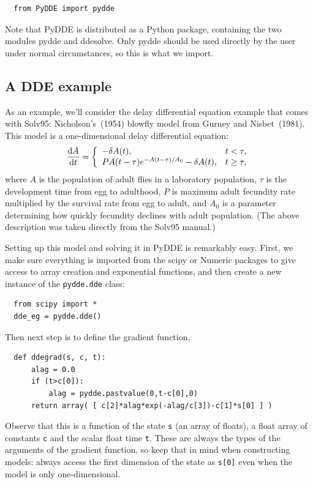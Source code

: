 \documentclass[10pt,a4paper] {article}
\newcommand{\dif}[2]{\frac{{\rm d} #1}{{\rm d} #2}}
\begin{document}
\begin{verbatim}
  from PyDDE import pydde
\end{verbatim}

Note that PyDDE is distributed as a Python package, containing the two modules pydde and ddesolve.  Only pydde should be used directly by the user under normal circumstances, so this is what we import.  

\subsection{A DDE example}

As an example, we'll consider the delay differential equation example that comes with Solv95: Nicholson's~(1954) blowfly model from Gurney and Nisbet~(1981).  This model is a one-dimensional delay differential equation:
$$
\dif{A}{t}= \left\{ \begin{array} {lc}
- \delta A(t), & t < \tau, \\
P A(t-\tau) e^{-A(t-\tau)/A_0} - \delta A(t), & t \ge \tau, \end{array} \right.
$$
where $ A $ is the population of adult flies in a laboratory population, $ \tau$ is the %
development time from egg to adulthood, $P$ is maximum adult fecundity rate multiplied by the %
survival rate from egg to adult, and $A_0$ is a parameter determining how quickly fecundity %
declines with adult population.  (The above description was taken directly from the Solv95 manual.)

Setting up this model and solving it in PyDDE is remarkably easy.  First, we make sure everything is imported from the scipy or Numeric packages to give access to array creation and exponential functions, and then create a new instance of the \verb+pydde.dde+ class:
\begin{verbatim}
  from scipy import *
  dde_eg = pydde.dde()
\end{verbatim}
Then next step is to define the gradient function,
\begin{verbatim}
  def ddegrad(s, c, t):
      alag = 0.0
      if (t>c[0]):
          alag = pydde.pastvalue(0,t-c[0],0)
      return array( [ c[2]*alag*exp(-alag/c[3])-c[1]*s[0] ] )
\end{verbatim}
Observe that this is a function of the state \verb+s+ (an array of floats), a float array of constants \verb+c+ and the scalar float time \verb+t+.  These are always the types of the arguments of the gradient function, so keep that in mind when constructing models: always access the first dimension of the state as \verb+s[0]+ even when the model is only one-dimensional.  
\end{document}
